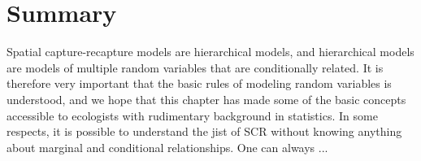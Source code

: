 \section{Summary}


Spatial capture-recapture models are hierarchical models, and hierarchical
models are models of multiple random variables that are conditionally
related. It is therefore very important that the basic rules of
modeling random variables is understood, and we hope that this chapter
has made some of the basic concepts accessible to ecologists with
rudimentary background in statistics. In some respects, it is possible
to understand the jist of SCR without knowing anything about marginal
and conditional relationships. One can always ...
